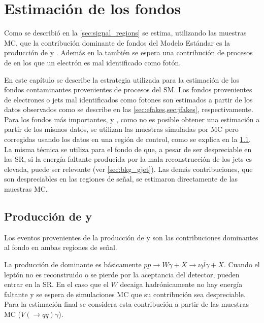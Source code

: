 \chapter{Estimación de los fondos} \label{cap:fondos}

Como se describió en la \cref{sec:signal_regions} se estima, utilizando las
muestras MC, que la contribución dominante de fondos del Modelo
Estándar es la producción de {\wgam} y {\ttgam}. Además en la {\SRL} también se
espera una contribución de procesos de {\ttbar} en los que un electrón es mal
identificado como fotón.

En este capítulo se describe la estrategia utilizada para la estimación de los
fondos contaminantes provenientes de procesos del SM.
Los fondos provenientes de electrones o jets mal identificados como fotones son
estimados a partir de los datos observados como se describe en las
\cref{sec:efakes,sec:jfakes}, respectivamente. %
Para los fondos más importantes, {\wgam} y
{\ttgam}, como no es posible obtener una estimación a partir de los mismos datos, se
utilizan las muestras simuladas por MC pero corregidas usando los datos en
una región de control, como se explica en la \cref{sec:bkg_wgam_ttgam}. La
misma técnica se utiliza para el fondo de {\gjet} que, a pesar de ser
despreciable en las SR, si la energía faltante producida por la mala
reconstrucción de los jets es elevada, puede ser relevante (ver
\cref{sec:bkg_gjet}). Las demás contribuciones, que son despreciables en
las regiones de señal, se estimaron directamente de las muestras MC.



\section[Producción de {\wgam} y $tt\gamma$]{Producción de {\wgam} y {\ttgam}}
\label{sec:bkg_wgam_ttgam}

Los eventos provenientes de la producción de {\wgam} y {\ttgam} son las
contribuciones dominantes al fondo en ambas regiones de señal.

La producción de {\wgam} dominante es básicamente $pp \to W\gamma + X \to \nu_l
\bar{l}\gamma + X$. Cuando el leptón no es reconstruido o se pierde por la
aceptancia del detector, pueden entrar en la SR. En el caso que el $W$
decaiga hadrónicamente no hay energía faltante y se espera de simulaciones MC que
su contribución sea despreciable. Para la estimación final se considera
esta contribución a partir de las muestras MC ($V(\to qq)\gamma$).

